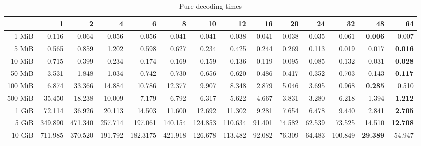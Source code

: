 \begin{centering}
\begin{table}[!h]
	\caption{Pure decoding times}
	\begin{tabular}{rrrrrrrrrrrrrr}
		\toprule
		\diagbox[width=7em]{Sizes}{Threads} & 1  &      2  &      4  &      6  &      8  &      10 &      12 &     16 &     20 &     24 &      32 &     48 &     64 \\
		\midrule
		1 MiB   &   0.116 &   0.064 &   0.056 &   0.056 &   0.041 &   0.041 &   0.038 &  0.041 &  0.038 &  0.035 &   0.061 &  \textbf{0.006} &  0.007 \\
		5 MiB   &   0.565 &   0.859 &   1.202 &   0.598 &   0.627 &   0.234 &   0.425 &  0.244 &  0.269 &  0.113 &   0.019 &  0.017 &  \textbf{0.016} \\
		10 MiB  &   0.715 &   0.399 &   0.234 &   0.174 &   0.169 &   0.159 &   0.136 &  0.119 &  0.095 &  0.085 &   0.132 &  0.031 &  \textbf{0.028} \\
		50 MiB  &   3.531 &   1.848 &   1.034 &   0.742 &   0.730 &   0.656 &   0.620 &  0.486 &  0.417 &  0.352 &   0.703 &  0.143 &  \textbf{0.117} \\
		100 MiB &   6.874 &  33.366 &  14.884 &  10.786 &  12.377 &   9.907 &   8.348 &  2.879 &  5.046 &  3.695 &   0.968 &  \textbf{0.285} &  0.510 \\
		500 MiB &  35.450 &  18.238 &  10.009 &   7.179 &   6.792 &   6.317 &   5.622 &  4.667 &  3.831 &  3.280 &   6.218 &  1.394 &  \textbf{1.212} \\
		1 GiB   &  72.114 &  36.926 &  20.113 &  14.503 &  11.600 &  12.692 &  11.302 &  9.281 &  7.654 &  6.478 &   9.440 &  2.841 &  \textbf{2.705} \\
		5 GiB   & 349.890 & 471.340 & 257.714 & 197.061 & 140.154 & 124.853 & 110.634 & 91.401 & 74.582 & 62.539 &  73.525 & 14.510 & \textbf{12.708} \\
		10 GiB  & 711.985 & 370.520 & 191.792 & 182.3175 & 421.918 & 126.678 & 113.482 & 92.082 & 76.309 & 64.483 & 100.849 & \textbf{29.389} & 54.947 \\
		\bottomrule
	\end{tabular}
\end{table}


\end{centering}
